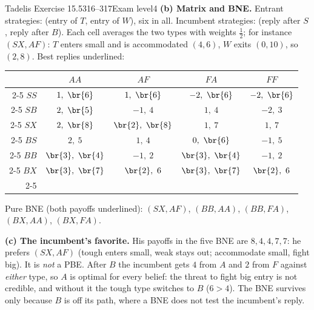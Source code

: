 \begin{exsol}{Tadelis Exercise 15.5}{316--317}{Exam level}{4}
\textbf{(b) Matrix and BNE.} Entrant strategies: (entry of $T$, entry of $W$), six in all. Incumbent strategies:
(reply after $S$, reply after $B$). Each cell averages the two types with weights $\frac12$; for instance
$(SX, AF)$: $T$ enters small and is accommodated $(4, 6)$, $W$ exits $(0, 10)$, so $(2, 8)$. Best replies
underlined:
\begin{center}
\begin{tabular}{r|c|c|c|c|}
\multicolumn{1}{r}{} & \multicolumn{1}{c}{$AA$} & \multicolumn{1}{c}{$AF$} & \multicolumn{1}{c}{$FA$} & \multicolumn{1}{c}{$FF$} \\ \cline{2-5}
$SS$ & $1,\ \br{6}$ & $1,\ \br{6}$ & $-2,\ \br{6}$ & $-2,\ \br{6}$ \\ \cline{2-5}
$SB$ & $2,\ \br{5}$ & $-1,\ 4$ & $1,\ 4$ & $-2,\ 3$ \\ \cline{2-5}
$SX$ & $2,\ \br{8}$ & $\br{2},\ \br{8}$ & $1,\ 7$ & $1,\ 7$ \\ \cline{2-5}
$BS$ & $2,\ 5$ & $1,\ 4$ & $0,\ \br{6}$ & $-1,\ 5$ \\ \cline{2-5}
$BB$ & $\br{3},\ \br{4}$ & $-1,\ 2$ & $\br{3},\ \br{4}$ & $-1,\ 2$ \\ \cline{2-5}
$BX$ & $\br{3},\ \br{7}$ & $\br{2},\ 6$ & $\br{3},\ \br{7}$ & $\br{2},\ 6$ \\ \cline{2-5}
\end{tabular}
\end{center}
Pure BNE (both payoffs underlined): $(SX, AF)$, $(BB, AA)$, $(BB, FA)$, $(BX, AA)$, $(BX, FA)$.

\textbf{(c) The incumbent's favorite.} His payoffs in the five BNE are $8, 4, 4, 7, 7$: he prefers $(SX, AF)$
(tough enters small, weak stays out; accommodate small, fight big). It is \emph{not} a PBE. After $B$ the
incumbent gets $4$ from $A$ and $2$ from $F$ against \emph{either} type, so $A$ is optimal for every belief:
the threat to fight big entry is not credible, and without it the tough type switches to $B$ ($6 > 4$). The
BNE survives only because $B$ is off its path, where a BNE does not test the incumbent's reply.


\end{exsol}

